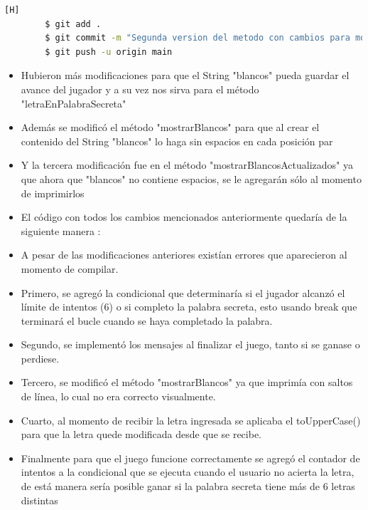 \documentclass{article}
\begin{document}
    

    \begin{lstlisting}[language=bash,caption={Commit: Segunda version del metodo con cambios para mostrar las letras adivinadas previamente al jugador}][H]
		$ git add .
		$ git commit -m "Segunda version del metodo con cambios para mostrar las letras adivinadas previamente al jugador"			
		$ git push -u origin main
    \end{lstlisting}

    
    \begin{itemize}	
        \item Hubieron más modificaciones para que el String "blancos" pueda guardar el avance del jugador y a su vez nos sirva para el método "letraEnPalabraSecreta" 
        \item Además se modificó el método "mostrarBlancos" para que al crear el contenido del String "blancos" lo haga sin espacios en cada posición par
        \item Y la tercera modificación fue en el método "mostrarBlancosActualizados" ya que ahora que "blancos" no contiene espacios, se le agregarán sólo al momento de imprimirlos
        \\
        \item El código con todos los cambios mencionados anteriormente quedaría de la siguiente manera : 
    \end{itemize}

    



    \begin{itemize}	
        \item A pesar de las modificaciones anteriores existían errores que aparecieron al momento de compilar.
        \item Primero, se agregó la condicional que determinaría si el jugador alcanzó el límite de intentos (6) o si completo la palabra secreta, esto usando break que terminará el bucle cuando se haya completado la palabra.
        \item Segundo, se implementó los mensajes al finalizar el juego, tanto si se ganase o perdiese.
        \item Tercero, se modificó el método "mostrarBlancos" ya que imprimía con saltos de línea, lo cual no era correcto visualmente.
        \item Cuarto, al momento de recibir la letra ingresada se aplicaba el toUpperCase() para que la letra quede modificada desde que se recibe.
        \item Finalmente para que el juego funcione correctamente se agregó el contador de intentos a la condicional que se ejecuta cuando el usuario no acierta la letra, de está manera sería posible ganar si la palabra secreta tiene más de 6 letras distintas
    \end{itemize}
\end{document}
